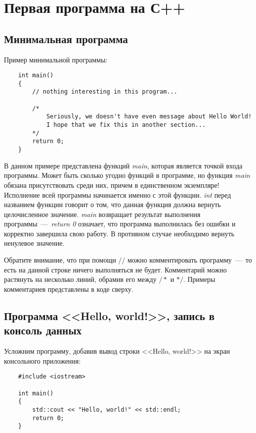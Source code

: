 \section{Первая программа на С++}
\subsection{Минимальная программа}

Пример минимальной программы:

\lstset{style=CPlusPlus}
\begin{lstlisting}
    int main()
    {
        // nothing interesting in this program...
        
        /*
            Seriously, we doesn't have even message about Hello World!
            I hope that we fix this in another section...
        */
        return 0;
    }
\end{lstlisting}

В данном примере представлена функций \textit{main}, которая является точкой входа программы. Может быть сколько угодно функций в программе, но функция \textit{main} обязана присутствовать среди них, причем в единственном экземпляре! Исполнение всей программы начинается именно с этой функции. \textit{int} перед названием функции говорит о том, что данная функция должна вернуть целочисленное значение. \textit{main} возвращает результат выполнения программы~---~\textit{return 0} означает, что программа выполнилась без ошибки и корректно завершила свою работу. В противном случае необходимо вернуть ненулевое значение.

Обратите внимание, что при помощи $//$ можно комментировать программу~---~то есть на данной строке ничего выполняться не будет. Комментарий можно растянуть на несколько линий, обрамив его между $/*$ и $*/$. Примеры комментариев представлены в коде сверху.

\subsection{Программа <<Hello, world!>>, запись в консоль данных}

Усложним программу, добавив вывод строки <<Hello, world!>> на экран консольного приложения:

\begin{lstlisting}
    #include <iostream>

    int main()
    {
        std::cout << "Hello, world!" << std::endl;
        return 0;
    }
\end{lstlisting}

